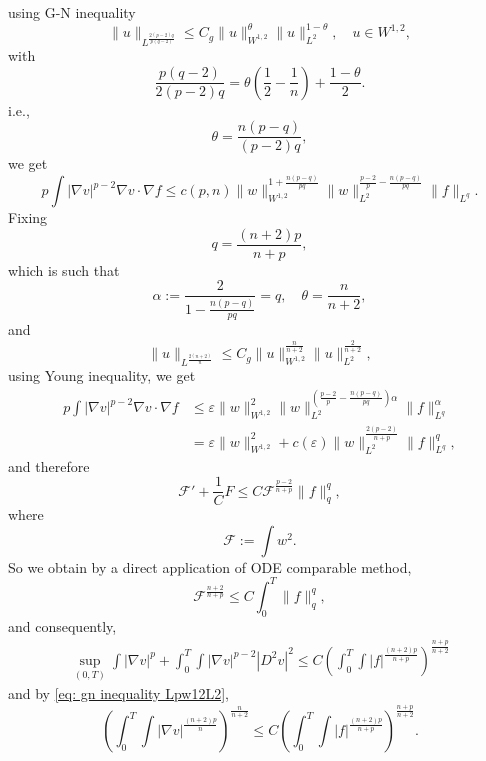 \documentclass[en,hazy,screen,blue,14pt]{elegantnote}
\numberwithin{dummy}{section}
\begin{document}
using G-N inequality
\[
	\|u\|_{L^{\frac{2(p-2)q}{p(q-2)}}}
	\leq C_g \|u\|_{W^{1,2}}^\theta\|u\|_{L^2}^{1-\theta},\quad u\in W^{1,2}, 
\]
with
\[
	\frac{p(q-2)}{2(p-2)q} = \theta\left(\frac12-\frac1n\right) + \frac{1-\theta}{2}.
\]
i.e.,
\[
	\theta = \frac{n(p-q)}{(p-2)q},
\]
we get
\begin{equation*}
	p\int |\nabla v|^{p-2}\nabla v \cdot \nabla f 
	\leq c(p,n) \|w\|_{W^{1,2}}^{1+\frac{n(p-q)}{pq}}
		\|w\|_{L^2}^{\frac{p-2}{p} - \frac{n(p-q)}{pq}}
		\|f\|_{L^q}.
\end{equation*}
Fixing 
\[
	q = \frac{(n+2)p}{n+p},
\]
which is such that
\[
	\alpha := \frac{2}{1-\frac{n(p-q)}{pq}} = q,\quad \theta = \frac{n}{n+2},
\]
and 
\begin{equation}\label{eq: gn inequality Lpw12L2}
	\|u\|_{L^{\frac{2(n+2)}{n}}} \leq C_g \|u\|_{W^{1,2}}^{\frac{n}{n+2}}\|u\|_{L^2}^{\frac{2}{n+2}},
\end{equation}
using Young inequality, we get
\begin{align*}
	p\int |\nabla v|^{p-2}\nabla v \cdot \nabla f 
	&\leq \varepsilon \|w\|_{W^{1,2}}^2
		\|w\|_{L^2}^{\left(\frac{p-2}{p} - \frac{n(p-q)}{pq}\right)\alpha}
		\|f\|_{L^q}^\alpha\\
	&= \varepsilon \|w\|_{W^{1,2}}^2
	+ c(\varepsilon) \|w\|_{L^2}^{\frac{2(p-2)}{n+p}}
	\|f\|_{L^q}^q,
\end{align*}
and therefore
\begin{equation*}
	\mathcal{F}' + \frac1C F \leq C \mathcal{F}^{\frac{p-2}{n+p}} \|f\|_q^q, 
\end{equation*} 
where
\[
	\mathcal{F} := \int w^2.
\]
So we obtain by a direct application of ODE comparable method,
\[
	\mathcal{F}^{\frac{n+2}{n+p}} \leq C \int_0^T\|f\|_q^q,
\]
and consequently,
\begin{align*}
	\sup_{(0,T)}\int |\nabla v|^p + \int_0^T\int |\nabla v|^{p-2}|D^2 v|^2 
	\leq C \left(\int_0^T\int |f|^{\frac{(n+2)p}{n+p}}\right)^{\frac{n+p}{n+2}}
\end{align*}
and by \eqref{eq: gn inequality Lpw12L2},
\begin{equation*}
	\left(\int_0^T\int |\nabla v|^{\frac{(n+2)p}{n}}\right)^{\frac{n}{n+2}} 
	\leq C \left(\int_0^T\int |f|^{\frac{(n+2)p}{n+p}}\right)^{\frac{n+p}{n+2}}. 
\end{equation*}






\printbibliography%
\end{document}
